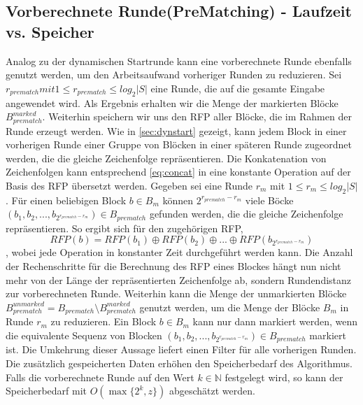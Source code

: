 \subsection{Vorberechnete Runde(PreMatching) - Laufzeit vs. Speicher}
Analog zu der dynamischen Startrunde kann eine vorberechnete Runde ebenfalls genutzt werden, um den Arbeitsaufwand vorheriger Runden zu reduzieren. Sei $r_{prematch} mit 
1\leq r_{prematch} \leq log_2{|S|}$ eine Runde, die auf die gesamte Eingabe angewendet wird. Als Ergebnis erhalten wir die Menge der markierten Blöcke $B_{prematch}^{marked}$.
Weiterhin speichern wir uns den RFP aller Blöcke, die im Rahmen der Runde erzeugt werden. Wie in \ref{sec:dynstart} gezeigt, kann jedem Block in einer vorherigen Runde einer Gruppe
von Blöcken in einer späteren Runde zugeordnet werden, die die gleiche Zeichenfolge repräsentieren. Die Konkatenation von Zeichenfolgen kann entsprechend \ref{eq:concat} in eine
konstante Operation auf der Basis des RFP übersetzt werden. Gegeben sei eine Runde $r_m$ mit $1\leq r_m \leq log_2{|S|}$. Für einen beliebigen Block $b \in B_m$ können $2^{r_{prematch}-r_m}$
viele Böcke $(b_1, b_2, ..., b_{2^{r_{prematch}-r_m}})\in B_{prematch}$ gefunden werden, die die gleiche Zeichenfolge repräsentieren. So ergibt sich für den zugehörigen RFP,
\begin{equation}
    RFP(b) = RFP(b_1) \oplus RFP(b_2) \oplus ... \oplus RFP(b_{2^{r_{prematch}-r_m}})
\end{equation}
, wobei jede Operation in konstanter Zeit durchgeführt werden kann. Die Anzahl der Rechenschritte für die Berechnung des RFP eines Blockes hängt nun nicht mehr von der Länge der
repräsentierten Zeichenfolge ab, sondern Rundendistanz zur vorberechneten Runde.
Weiterhin kann die Menge der unmarkierten Blöcke $B_{prematch}^{unmarked}=B_{prematch}\setminus B_{prematch}^{marked}$ genutzt werden, um die Menge der Blöcke $B_m$ in Runde $r_m$
zu reduzieren. Ein Block $b \in B_m$ kann nur dann markiert werden, wenn die equivalente Sequenz von Blocken $(b_1, b_2, ..., b_{2^{r_{prematch}-r_m}})\in B_{prematch}$ markiert ist.
Die Umkehrung dieser Aussage liefert einen Filter für alle vorherigen Runden. Die zusätzlich gespeicherten Daten erhöhen den Speicherbedarf des Algorithmus. Falls die vorberechnete
Runde auf den Wert $k\in \mathbb{N}$ festgelegt wird, so kann der Speicherbedarf mit $O(\max\{2^k, z\})$ abgeschätzt werden.

